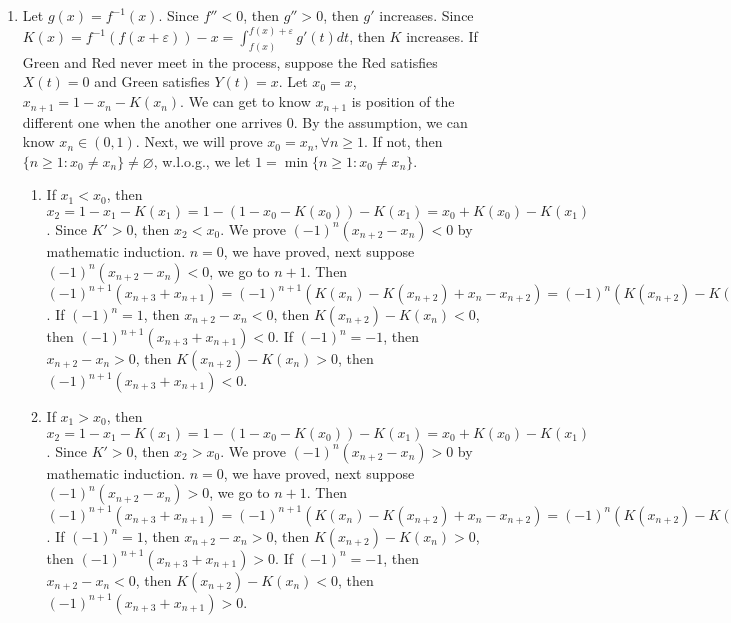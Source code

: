 \documentclass{ctexart}
\begin{document}
\begin{solution}\label{pro:7}
  \begin{enumerate}
    \item Let \(g(x)=f^{-1}(x)\). Since \(f'' <0\), then \(g'' >0\), then \(g'\) increases.
      Since \(K(x)=f^{-1}(f(x + \varepsilon))-x=\int_{f(x)}^{f(x) + \varepsilon} g'(t) dt\), then \(K\) increases.
      If Green and Red never meet in the process, suppose the Red satisfies \(X(t)=0\) and Green satisfies \(Y(t)=x\).
      Let \(x_0=x\), \(x_{n + 1}= 1-x_n -K(x_n)\). We can get to know \(x_{n + 1}\) is position of the different one when the another one arrives \(0\).
      By the assumption, we can know \(x_n \in (0,1)\).
      Next, we will prove \(x_0 = x_n, \forall n \geq 1\).
      If not, then \(\{n \geq 1: x_0 \neq x_n\} \neq \varnothing\), w.l.o.g., we let \(1 = \min \{n \geq 1: x_0 \neq x_n\}\).
      \begin{enumerate}
        \item If \(x_1 < x_0\), then \(x_2=1-x_1-K(x_1)=1-(1-x_0-K(x_0))-K(x_1)=x_{0} + K(x_0) -K(x_1)\).
          Since \(K' >0\), then \(x_2 <x_0\).
          We prove \((-1)^n(x_{n + 2}-x_{n} )<0\) by mathematic induction.
          \(n=0\), we have proved, next suppose \((-1)^n(x_{n + 2}-x_{n}) <0\), we go to \(n + 1\).
          Then \((-1)^{n + 1}(x_{n + 3} + x_{n + 1}) = (-1)^{n + 1} (K(x_n)-K(x_{n + 2}) + x_n - x_{n + 2}) = (-1)^{n}(K(x_{n + 2})- K(x_n)) + (-1)^{n}(x_{n + 2}-x_n)\).
          If \((-1)^n =1\), then \(x_{n + 2}-x_n <0\), then \(K(x_{n + 2})-K(x_n)<0\), then \((-1)^{n + 1}(x_{n + 3} + x_{n + 1})<0\).
          If \((-1)^n=-1\), then \(x_{n + 2}-x_n >0\), then \(K(x_{n + 2})-K(x_n) >0\), then \((-1)^{n + 1}(x_{n + 3} + x_{n + 1})<0\).
        \item If \(x_1 > x_0\), then \(x_2=1-x_1-K(x_1)=1-(1-x_0-K(x_0))-K(x_1)=x_{0} + K(x_0) -K(x_1)\).
          Since \(K' >0\), then \(x_2 >x_0\).
          We prove \((-1)^n(x_{n + 2}-x_{n} )>0\) by mathematic induction.
          \(n=0\), we have proved, next suppose \((-1)^n(x_{n + 2}-x_{n}) >0\), we go to \(n + 1\).
          Then \((-1)^{n + 1}(x_{n + 3} + x_{n + 1}) = (-1)^{n + 1} (K(x_n)-K(x_{n + 2}) + x_n - x_{n + 2}) = (-1)^{n}(K(x_{n + 2})- K(x_n)) + (-1)^{n}(x_{n + 2}-x_n)\).
          If \((-1)^n =1\), then \(x_{n + 2}-x_n >0\), then \(K(x_{n + 2})-K(x_n)>0\), then \((-1)^{n + 1}(x_{n + 3} + x_{n + 1})>0\).
          If \((-1)^n=-1\), then \(x_{n + 2}-x_n <0\), then \(K(x_{n + 2})-K(x_n) <0\), then \((-1)^{n + 1}(x_{n + 3} + x_{n + 1})>0\).
      \end{enumerate}

\end{enumerate}
\end{solution}
\end{document}
